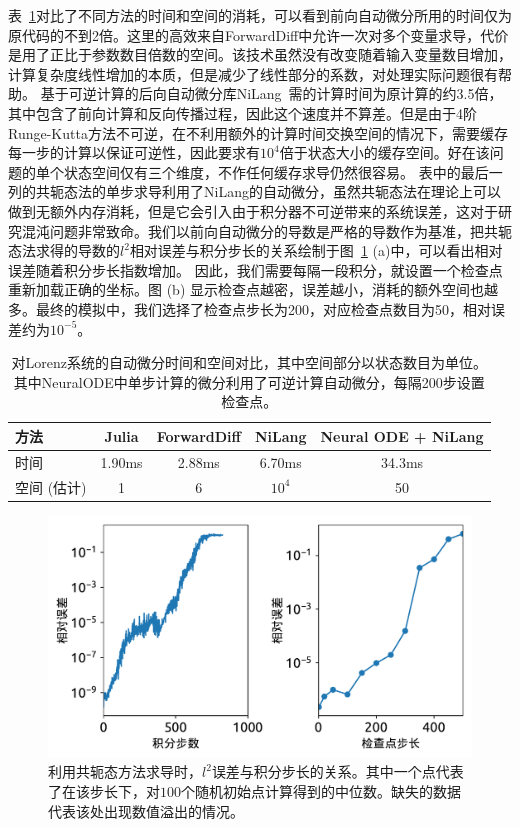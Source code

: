 \documentclass[A4,twoside,UTF8]{ctexart}
\begin{document}
表~\ref{tbl:lorenztiming}对比了不同方法的时间和空间的消耗，可以看到前向自动微分所用的时间仅为原代码的不到2倍。这里的高效来自ForwardDiff中允许一次对多个变量求导，代价是用了正比于参数数目倍数的空间。该技术虽然没有改变随着输入变量数目增加，计算复杂度线性增加的本质，但是减少了线性部分的系数，对处理实际问题很有帮助。
基于可逆计算的后向自动微分库NiLang~\cite{Liu2020b}需的计算时间为原计算的约3.5倍，其中包含了前向计算和反向传播过程，因此这个速度并不算差。但是由于4阶Runge-Kutta方法不可逆，在不利用额外的计算时间交换空间的情况下，需要缓存每一步的计算以保证可逆性，因此要求有$10^4$倍于状态大小的缓存空间。好在该问题的单个状态空间仅有三个维度，不作任何缓存求导仍然很容易。
表中的最后一列的共轭态法的单步求导利用了NiLang的自动微分，虽然共轭态法在理论上可以做到无额外内存消耗，但是它会引入由于积分器不可逆带来的系统误差，这对于研究混沌问题非常致命。我们以前向自动微分的导数是严格的导数作为基准，把共轭态法求得的导数的$l^2$相对误差与积分步长的关系绘制于图~\ref{fig:neuralode-error} (a)中，可以看出相对误差随着积分步长指数增加。
因此，我们需要每隔一段积分，就设置一个检查点重新加载正确的坐标。图 (b) 显示检查点越密，误差越小，消耗的额外空间也越多。最终的模拟中，我们选择了检查点步长为200，对应检查点数目为50，相对误差约为$10^{-5}$。

\begin{table}\centering
    \begin{tabularx}{0.8\textwidth}{Xcccc}\toprule
        方法 & Julia & ForwardDiff & NiLang & Neural ODE + NiLang\\
        \hline
        时间          & 1.90ms   &  2.88ms & 6.70ms & 34.3ms\\  %
        空间 (估计)          & 1   &  6 & $10^4$ & 50\\  %
        \bottomrule
    \end{tabularx}
    \caption{对Lorenz系统的自动微分时间和空间对比，其中空间部分以状态数目为单位。
    其中NeuralODE中单步计算的微分利用了可逆计算自动微分，每隔200步设置检查点。}\label{tbl:lorenztiming}
\end{table}

\begin{figure}[t]
\centering
\includegraphics[width=0.6\columnwidth]{./fig2.pdf}
    \caption{利用共轭态方法求导时，$l^2$误差与积分步长的关系。其中一个点代表了在该步长下，对$100$个随机初始点计算得到的中位数。缺失的数据代表该处出现数值溢出的情况。\label{fig:neuralode-error}}
\end{figure}
\end{document}
